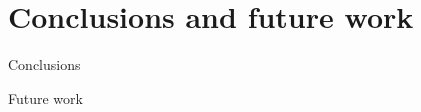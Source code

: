 \documentclass[9pt, pstricks, xcolor=dvipsnames]{beamer}
\begin{document}
\section{Conclusions and future work}
\frame{\insertsection}
\begin{frame}{Conclusions}
    
\end{frame}

\begin{frame}{Future work}
    
\end{frame}
\AtEndDocument\maketitle
\end{document}
